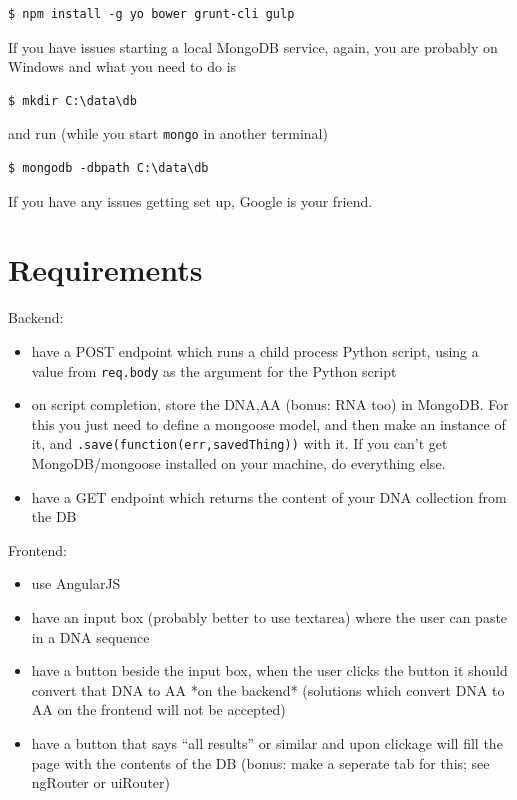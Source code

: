 \begin{verbatim}
$ npm install -g yo bower grunt-cli gulp
\end{verbatim}

If you have issues starting a local MongoDB service, again, you are probably on
Windows and what you need to do is 

\begin{verbatim}
$ mkdir C:\data\db    
\end{verbatim}

and run (while you start \texttt{mongo} in another terminal) 

\begin{verbatim}
$ mongodb -dbpath C:\data\db  
\end{verbatim}
If you have any issues getting set up, Google is your friend. 

\section{Requirements}

\noindent Backend:
\begin{itemize}
    \item have a POST endpoint which runs a child process Python script, using a
        value from \texttt{req.body} as the argument for the Python script 

    \item on script completion, store the DNA,AA (bonus: RNA too) in MongoDB.
        For this you just need to define a mongoose model, and then make an
        instance of it, and \texttt{.save(function(err,savedThing))} with it. If
        you can't get MongoDB/mongoose installed on your machine, do everything
        else. 

    \item have a GET endpoint which returns the content of your DNA collection
        from the DB 

\end{itemize}

\noindent Frontend:
\begin{itemize}
    \item use AngularJS
    \item have an input box (probably better to use textarea) where the user can
        paste in a DNA sequence

    \item have a button beside the input box, when the user clicks the button it
        should convert that DNA to AA *on the backend* (solutions which convert
        DNA to AA on the frontend will not be accepted)
    
    \item have a button that says ``all results'' or similar and upon clickage
        will fill the page with the contents of the DB (bonus: make a seperate
        tab for this; see ngRouter or uiRouter) 

\end{itemize}

